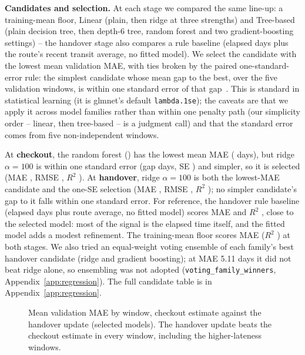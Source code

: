 \documentclass[12pt,a4paper]{article}
\begin{document}
\textbf{Candidates and selection.} At each stage we compared the same line-up: a training-mean floor, Linear (plain, then ridge at three strengths) and Tree-based (plain decision tree, then depth-6 tree, random forest and two gradient-boosting settings) -- the handover stage also compares a rule baseline (elapsed days plus the route's recent transit average, no fitted model). We select the candidate with the lowest mean validation MAE, with ties broken by the paired one-standard-error rule: the simplest candidate whose mean gap to the best, over the five validation windows, is within one standard error of that gap~\cite{james2013}. This is standard in statistical learning (it is glmnet's default \texttt{lambda.1se}); the caveats are that we apply it across model families rather than within one penalty path (our simplicity order -- linear, then tree-based -- is a judgment call) and that the standard error comes from five non-independent windows.

At \textbf{checkout}, the random forest (\CheckoutBestName{}) has the lowest mean MAE (\CheckoutBestMAE{} days), but ridge \(\alpha=100\) is within one standard error (gap \CheckoutSelGap{} days, SE \CheckoutSelGapSE{}) and simpler, so it is selected (MAE \CheckoutSelMAE{}, RMSE \CheckoutSelRMSE{}, \(R^2\) \CheckoutSelRSq{}). At \textbf{handover}, ridge \(\alpha=100\) is both the lowest-MAE candidate and the one-SE selection (MAE \HandoverSelMAE{}, RMSE \HandoverSelRMSE{}, \(R^2\) \HandoverSelRSq{}); no simpler candidate's gap to it falls within one standard error. For reference, the handover rule baseline (elapsed days plus route average, no fitted model) scores MAE \HandoverRuleMAE{} and \(R^2\) \HandoverRuleRSq{}, close to the selected model: most of the signal is the elapsed time itself, and the fitted model adds a modest refinement. The training-mean floor scores MAE \CheckoutMeanMAE{} ($R^2$ \CheckoutMeanRSq{}) at both stages. We also tried an equal-weight voting ensemble of each family's best handover candidate (ridge and gradient boosting); at MAE 5.11 days it did not beat ridge alone, so ensembling was not adopted (\texttt{voting\_family\_winners}, Appendix~\ref{app:regression}). The full candidate table is in Appendix~\ref{app:regression}.

\begin{figure}[ht]
\centering

\caption{Mean validation MAE by window, checkout estimate against the handover update (selected models). The handover update beats the checkout estimate in every window, including the higher-lateness windows.}
\label{fig:ladder}
\end{figure}
\end{document}
